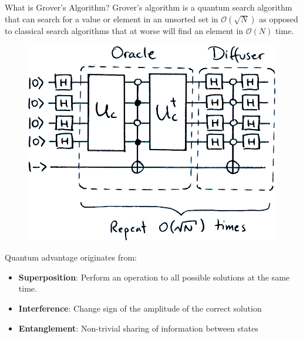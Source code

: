 \documentclass[11p,aspectratio=169]{beamer}
\begin{document}
\begin{frame}{What is Grover’s Algorithm?}
    Grover’s algorithm is a quantum search algorithm that can search for a value or element in an
    unsorted set in $\mathcal{O}(\sqrt{N})$ as opposed to classical search algorithms that at worse will find an
    element in $\mathcal{O}(N)$ time. 

    \begin{figure}
        \includegraphics[height= 0.4 \textheight]{figures/grover.png}
    \end{figure}

    Quantum advantage originates from:
    \begin{itemize}
        \item \textbf{Superposition}: Perform an operation to all
        possible solutions at the same time.
        \item \textbf{Interference}: Change sign of the amplitude of the correct solution
        \item \textbf{Entanglement}: Non-trivial sharing of information between states
    \end{itemize}
\end{frame}
\end{document}
